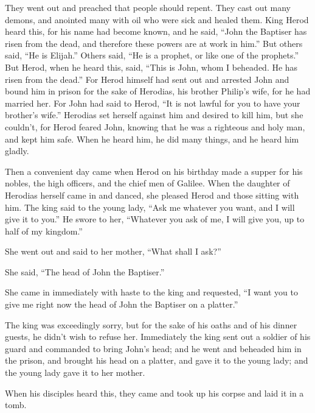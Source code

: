  They went out and preached that people should repent.
 They cast out many demons, and anointed many with oil
who were sick and healed them.  King Herod heard this,
for his name had become known, and he said, ``John the Baptiser has
risen from the dead, and therefore these powers are at work in him.''
 But others said, ``He is Elijah.'' Others said, ``He is
a prophet, or like one of the prophets.''  But Herod,
when he heard this, said, ``This is John, whom I beheaded. He has risen
from the dead.''  For Herod himself had sent out and
arrested John and bound him in prison for the sake of Herodias, his
brother Philip's wife, for he had married her.  For John
had said to Herod, ``It is not lawful for you to have your brother's
wife.''  Herodias set herself against him and desired to
kill him, but she couldn't,  for Herod feared John,
knowing that he was a righteous and holy man, and kept him safe. When he
heard him, he did many things, and he heard him gladly.

 Then a convenient day came when Herod on his birthday
made a supper for his nobles, the high officers, and the chief men of
Galilee.  When the daughter of Herodias herself came in
and danced, she pleased Herod and those sitting with him. The king said
to the young lady, ``Ask me whatever you want, and I will give it to
you.''  He swore to her, ``Whatever you ask of me, I will
give you, up to half of my kingdom.''

 She went out and said to her mother, ``What shall I
ask?''

She said, ``The head of John the Baptiser.''

 She came in immediately with haste to the king and
requested, ``I want you to give me right now the head of John the
Baptiser on a platter.''

 The king was exceedingly sorry, but for the sake of his
oaths and of his dinner guests, he didn't wish to refuse her.
 Immediately the king sent out a soldier of his guard and
commanded to bring John's head; and he went and beheaded him in the
prison,  and brought his head on a platter, and gave it
to the young lady; and the young lady gave it to her mother.

 When his disciples heard this, they came and took up his
corpse and laid it in a tomb.

